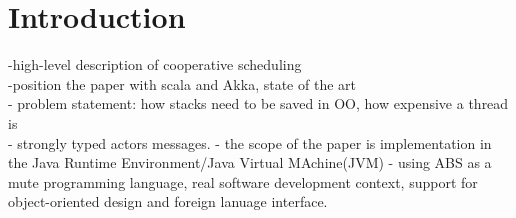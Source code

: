 \section{Introduction}

-high-level description of cooperative scheduling\\
-position the paper with scala and Akka, state of the art\\
- problem statement: how stacks need to be saved in OO, how expensive a thread is\\
- strongly typed actors messages.
- the scope of the paper is implementation in the Java Runtime Environment/Java Virtual MAchine(JVM)
- using ABS as a mute programming language, real software development context, support for object-oriented design and foreign lanuage interface.
